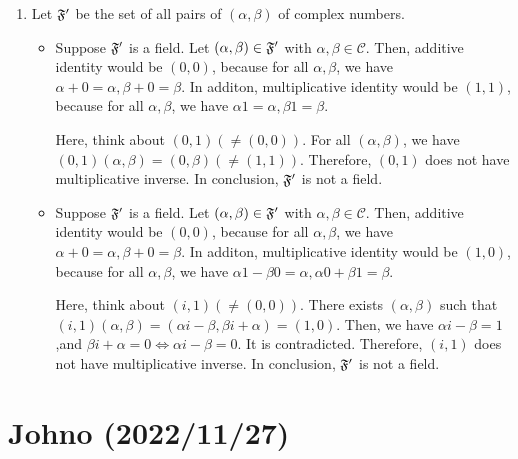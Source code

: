 \documentclass{article}
\newcommand\C{\mathcal C}
\begin{document}
\begin{enumerate}[label = (\alph*)]
\begin{enumerate}[label=(\Alph*)]
\item $(\alpha_1,\beta_1)((\alpha_2,\beta_2) + (\alpha_3,\beta_3)) = (\alpha_1,\beta_1)(\alpha_2+\alpha_3,\beta_2+\beta_3) = (\alpha_1\alpha_2 + \alpha_1\alpha_3-\beta_1\beta_2-\beta_1\beta_3,\alpha_1\beta_2+\alpha_1\beta_3+\beta_1\alpha_2+\beta_1\alpha_3) = (\alpha_1\alpha_2 - \beta_1\beta_2,\alpha_1\beta_2 + \beta_1\alpha_2) + (\alpha_1\alpha_3 - \beta_1\beta_3,\alpha_1\beta_3 + \alpha_3\beta_1) = (\alpha_1,\beta_1)(\alpha_2,\beta_2) + (\alpha_1,\beta_1)(\alpha_3,\beta_3)$.(distributive law stands)
\end{enumerate}
\item
Let $\mathfrak F'$ be the set of all pairs of $(\alpha,\beta)$ of complex numbers.
\begin{itemize}
\item[(a)]
Suppose $\mathfrak F'$ is a field.
Let $(\alpha,\beta) \in \mathfrak F'$ with $\alpha,\beta \in \C$. 
Then, additive identity would be $(0,0)$, because for all $\alpha,\beta$, we have $\alpha + 0 = \alpha, \beta + 0 = \beta$.
In additon, multiplicative identity would be $(1,1)$, because for all $\alpha,\beta$, we have $\alpha1 = \alpha, \beta1 = \beta$.

Here, think about $(0,1) (\ne (0,0))$.
For all $(\alpha, \beta)$, we have $(0,1)(\alpha, \beta) = (0, \beta) (\ne (1,1))$. Therefore, $(0,1)$ does not have multiplicative inverse.
In conclusion, $\mathfrak F'$ is not a field. 
\item[(b)]
Suppose $\mathfrak F'$ is a field.
Let $(\alpha,\beta) \in \mathfrak F'$ with $\alpha, \beta \in \C$. 
Then, additive identity would be $(0,0)$, because for all $\alpha,\beta$, we have $\alpha + 0 = \alpha, \beta + 0 = \beta$.
In additon, multiplicative identity would be $(1,0)$, because for all $\alpha,\beta$, we have $\alpha1 - \beta0 = \alpha, \alpha0 + \beta1 = \beta$.

Here, think about $(i,1) (\ne (0,0))$.
There exists $(\alpha, \beta)$ such that $(i,1)(\alpha, \beta) = (\alpha i -\beta, \beta i + \alpha) = (1,0)$. 
Then, we have $\alpha i -\beta = 1$,and $\beta i + \alpha = 0 \iff \alpha i -\beta = 0$. It is contradicted.
Therefore, $(i,1)$ does not have multiplicative inverse.
In conclusion, $\mathfrak F'$ is not a field. 
\end{itemize}
\end{enumerate}

\section{Johno (2022/11/27)}
\end{document}
